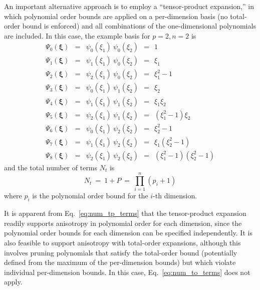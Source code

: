 An important alternative approach is to employ a ``tensor-product
expansion,'' in which polynomial order bounds are applied on a
per-dimension basis (no total-order bound is enforced) and all
combinations of the one-dimensional polynomials are included.  
In this case, the example basis for $p = 2, n = 2$ is
\begin{eqnarray}
\Psi_0(\boldsymbol{\xi}) & = & \psi_0(\xi_1) ~ \psi_0(\xi_2) ~~=~~ 1 
\nonumber \\
\Psi_1(\boldsymbol{\xi}) & = & \psi_1(\xi_1) ~ \psi_0(\xi_2) ~~=~~ \xi_1 
\nonumber \\
\Psi_2(\boldsymbol{\xi}) & = & \psi_2(\xi_1) ~ \psi_0(\xi_2) ~~=~~ \xi_1^2 - 1
\nonumber \\
\Psi_3(\boldsymbol{\xi}) & = & \psi_0(\xi_1) ~ \psi_1(\xi_2) ~~=~~ \xi_2
\nonumber \\
\Psi_4(\boldsymbol{\xi}) & = & \psi_1(\xi_1) ~ \psi_1(\xi_2) ~~=~~ \xi_1 \xi_2 
\nonumber \\
\Psi_5(\boldsymbol{\xi}) & = & \psi_2(\xi_1) ~ \psi_1(\xi_2) ~~=~~ 
(\xi_1^2 - 1) \xi_2 \nonumber \\
\Psi_6(\boldsymbol{\xi}) & = & \psi_0(\xi_1) ~ \psi_2(\xi_2) ~~=~~ \xi_2^2 - 1 
\nonumber \\
\Psi_7(\boldsymbol{\xi}) & = & \psi_1(\xi_1) ~ \psi_2(\xi_2) ~~=~~ 
\xi_1 (\xi_2^2 - 1) \nonumber \\
\Psi_8(\boldsymbol{\xi}) & = & \psi_2(\xi_1) ~ \psi_2(\xi_2) ~~=~~ 
(\xi_1^2 - 1) (\xi_2^2 - 1) \nonumber
\end{eqnarray}
and the total number of terms $N_t$ is
\begin{equation}
N_t ~=~ 1 + P ~=~ \prod_{i=1}^{n} (p_i + 1) \label{eq:num_tp_terms}
\end{equation}
where $p_i$ is the polynomial order bound for the $i$-th dimension.

It is apparent from Eq.~\ref{eq:num_tp_terms} that the tensor-product
expansion readily supports anisotropy in polynomial order for each
dimension, since the polynomial order bounds for each dimension can be
specified independently.  It is also feasible to support anisotropy
with total-order expansions, although this involves pruning
polynomials that satisfy the total-order bound (potentially defined
from the maximum of the per-dimension bounds) but which violate
individual per-dimension bounds.  In this case,
Eq.~\ref{eq:num_to_terms} does not apply.

